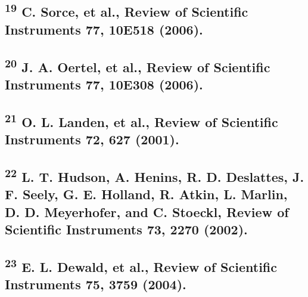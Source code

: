 \subsection{\texorpdfstring{\textsuperscript{19} C. Sorce, et al.,
Review of Scientific Instruments 77, 10E518
(2006).}{19 C. Sorce, et al., Review of Scientific Instruments 77, 10E518 (2006).}}\label{c.-sorce-et-al.-review-of-scientific-instruments-77-10e518-2006.}

\subsection{\texorpdfstring{\textsuperscript{20} J. A. Oertel, et al.,
Review of Scientific Instruments 77, 10E308
(2006).}{20 J. A. Oertel, et al., Review of Scientific Instruments 77, 10E308 (2006).}}\label{j.-a.-oertel-et-al.-review-of-scientific-instruments-77-10e308-2006.}

\subsection{\texorpdfstring{\textsuperscript{21} O. L. Landen, et al.,
Review of Scientific Instruments 72, 627
(2001).}{21 O. L. Landen, et al., Review of Scientific Instruments 72, 627 (2001).}}\label{o.-l.-landen-et-al.-review-of-scientific-instruments-72-627-2001.}

\subsection{\texorpdfstring{\textsuperscript{22} L. T. Hudson, A.
Henins, R. D. Deslattes, J. F. Seely, G. E. Holland, R. Atkin, L.
Marlin, D. D. Meyerhofer, and C. Stoeckl, Review of Scientific
Instruments 73, 2270
(2002).}{22 L. T. Hudson, A. Henins, R. D. Deslattes, J. F. Seely, G. E. Holland, R. Atkin, L. Marlin, D. D. Meyerhofer, and C. Stoeckl, Review of Scientific Instruments 73, 2270 (2002).}}\label{l.-t.-hudson-a.-henins-r.-d.-deslattes-j.-f.-seely-g.-e.-holland-r.-atkin-l.-marlin-d.-d.-meyerhofer-and-c.-stoeckl-review-of-scientific-instruments-73-2270-2002.}

\subsection{\texorpdfstring{\textsuperscript{23} E. L. Dewald, et al.,
Review of Scientific Instruments 75, 3759
(2004).}{23 E. L. Dewald, et al., Review of Scientific Instruments 75, 3759 (2004).}}\label{e.-l.-dewald-et-al.-review-of-scientific-instruments-75-3759-2004.}

